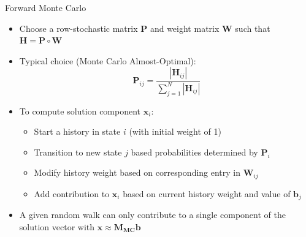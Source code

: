 \documentclass{beamer}
\begin{document}
\begin{frame}{Forward Monte Carlo}
\begin{itemize}
  \item Choose a row-stochastic matrix $\mathbf{P}$ and weight matrix
    $\mathbf{W}$ such that $\mathbf{H} = \mathbf{P} \circ \mathbf{W}$
  \item Typical choice (Monte Carlo Almost-Optimal):
    \begin{equation*}
      \mathbf{P}_{ij} = \frac{| \mathbf{H}_{ij}| }
      {\sum_{j=1}^{N} | \mathbf{H}_{ij} | }
    \end{equation*}
  \item To compute solution component $\mathbf{x}_i$:
    \begin{itemize}
      \item Start a history in state $i$ (with initial weight of 1)
      \item Transition to new state $j$ based probabilities determined by
        $\mathbf{P}_i$
      \item Modify history weight based on corresponding entry in
        $\mathbf{W}_{ij}$
      \item Add contribution to $\mathbf{x}_i$ based on current history weight
        and value of $\mathbf{b}_j$
    \end{itemize}
  \item A given random walk can only contribute to a single component of
    the solution vector with $\mathbf{x} \approx \mathbf{M_{MC}} \mathbf{b}$
\end{itemize}
\end{frame}
\end{document}
